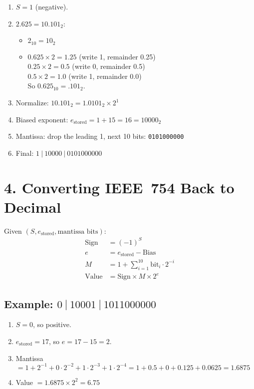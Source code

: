 \documentclass[12pt]{article}
\begin{document}
\begin{enumerate}
  \item $S=1$ (negative).
  \item $2.625 = 10.101_2$:
    \begin{itemize}
      \item $2_{10} = 10_2$
      \item $0.625 \times 2 = 1.25$ (write 1, remainder 0.25)\\
      $0.25 \times 2 = 0.5$ (write 0, remainder 0.5)\\
      $0.5 \times 2 = 1.0$ (write 1, remainder 0.0)\\
      So $0.625_{10} = .101_2$.
    \end{itemize}
  \item Normalize: $10.101_2 = 1.0101_2 \times 2^{1}$
  \item Biased exponent: $e_{\text{stored}} = 1 + 15 = 16 = 10000_2$
  \item Mantissa: drop the leading 1, next 10 bits: \texttt{0101000000}
  \item Final: $1\ |\ 10000\ |\ 0101000000$
\end{enumerate}

\section*{4. Converting IEEE~754 Back to Decimal}
Given $(S, e_{\text{stored}}, \text{mantissa bits})$:
\begin{align*}
\text{Sign} &= (-1)^S \\
e &= e_{\text{stored}} - \text{Bias} \\
M &= 1 + \sum_{i=1}^{10} \text{bit}_i \cdot 2^{-i} \\
\text{Value} &= \text{Sign} \times M \times 2^e
\end{align*}

\subsection*{Example: $0\ |\ 10001\ |\ 1011000000$}
\begin{enumerate}
  \item $S=0$, so positive.
  \item $e_{\text{stored}} = 17$, so $e = 17 - 15 = 2$.
  \item Mantissa $= 1 + 2^{-1} + 0 \cdot 2^{-2} + 1 \cdot 2^{-3} + 1 \cdot 2^{-4} = 1 + 0.5 + 0 + 0.125 + 0.0625 = 1.6875$
  \item Value $= 1.6875 \times 2^2 = 6.75$
\end{enumerate}
\end{document}
